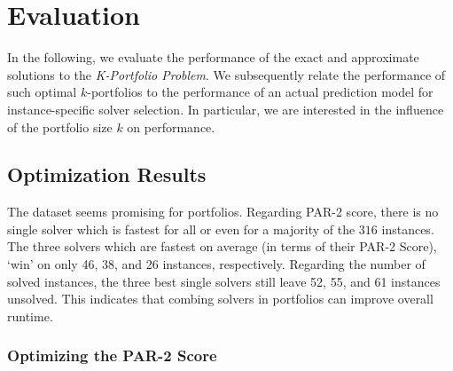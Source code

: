 \documentclass[conference]{IEEEtran}
\begin{document}
\section{Evaluation}
\label{sec:evaluation}

In the following, we evaluate the performance of the exact and approximate solutions to the \emph{K-Portfolio Problem}. 
We subsequently relate the performance of such optimal $k$-portfolios to the performance of an actual prediction model for instance-specific solver selection. 
In particular, we are interested in the influence of the portfolio size $k$ on performance. 

\subsection{Optimization Results}

The dataset seems promising for portfolios.
Regarding \mbox{PAR-2} score, there is no single solver which is fastest for all or even for a majority of the $316$ instances. 
The three solvers which are fastest on average (in terms of their PAR-2 Score), `win' on only 46, 38, and 26 instances, respectively. 
Regarding the number of solved instances, the three best single solvers still leave 52, 55, and 61 instances unsolved. 
This indicates that combing solvers in portfolios can improve overall runtime.

\subsubsection{Optimizing the PAR-2 Score}
\end{document}
